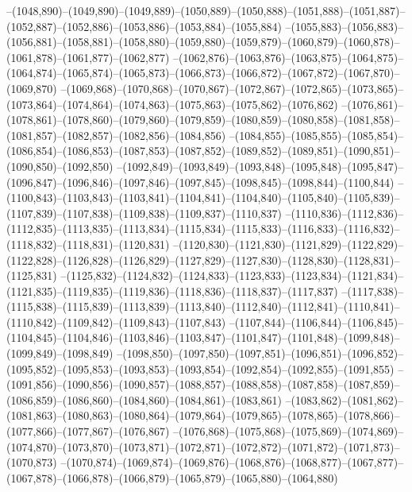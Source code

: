 --(1048,890)--(1049,890)--(1049,889)--(1050,889)--(1050,888)--(1051,888)--(1051,887)--(1052,887)--(1052,886)--(1053,886)--(1053,884)--(1055,884)
--(1055,883)--(1056,883)--(1056,881)--(1058,881)--(1058,880)--(1059,880)--(1059,879)--(1060,879)--(1060,878)--(1061,878)--(1061,877)--(1062,877)
--(1062,876)--(1063,876)--(1063,875)--(1064,875)--(1064,874)--(1065,874)--(1065,873)--(1066,873)--(1066,872)--(1067,872)--(1067,870)--(1069,870)
--(1069,868)--(1070,868)--(1070,867)--(1072,867)--(1072,865)--(1073,865)--(1073,864)--(1074,864)--(1074,863)--(1075,863)--(1075,862)--(1076,862)
--(1076,861)--(1078,861)--(1078,860)--(1079,860)--(1079,859)--(1080,859)--(1080,858)--(1081,858)--(1081,857)--(1082,857)--(1082,856)--(1084,856)
--(1084,855)--(1085,855)--(1085,854)--(1086,854)--(1086,853)--(1087,853)--(1087,852)--(1089,852)--(1089,851)--(1090,851)--(1090,850)--(1092,850)
--(1092,849)--(1093,849)--(1093,848)--(1095,848)--(1095,847)--(1096,847)--(1096,846)--(1097,846)--(1097,845)--(1098,845)--(1098,844)--(1100,844)
--(1100,843)--(1103,843)--(1103,841)--(1104,841)--(1104,840)--(1105,840)--(1105,839)--(1107,839)--(1107,838)--(1109,838)--(1109,837)--(1110,837)
--(1110,836)--(1112,836)--(1112,835)--(1113,835)--(1113,834)--(1115,834)--(1115,833)--(1116,833)--(1116,832)--(1118,832)--(1118,831)--(1120,831)
--(1120,830)--(1121,830)--(1121,829)--(1122,829)--(1122,828)--(1126,828)--(1126,829)--(1127,829)--(1127,830)--(1128,830)--(1128,831)--(1125,831)
--(1125,832)--(1124,832)--(1124,833)--(1123,833)--(1123,834)--(1121,834)--(1121,835)--(1119,835)--(1119,836)--(1118,836)--(1118,837)--(1117,837)
--(1117,838)--(1115,838)--(1115,839)--(1113,839)--(1113,840)--(1112,840)--(1112,841)--(1110,841)--(1110,842)--(1109,842)--(1109,843)--(1107,843)
--(1107,844)--(1106,844)--(1106,845)--(1104,845)--(1104,846)--(1103,846)--(1103,847)--(1101,847)--(1101,848)--(1099,848)--(1099,849)--(1098,849)
--(1098,850)--(1097,850)--(1097,851)--(1096,851)--(1096,852)--(1095,852)--(1095,853)--(1093,853)--(1093,854)--(1092,854)--(1092,855)--(1091,855)
--(1091,856)--(1090,856)--(1090,857)--(1088,857)--(1088,858)--(1087,858)--(1087,859)--(1086,859)--(1086,860)--(1084,860)--(1084,861)--(1083,861)
--(1083,862)--(1081,862)--(1081,863)--(1080,863)--(1080,864)--(1079,864)--(1079,865)--(1078,865)--(1078,866)--(1077,866)--(1077,867)--(1076,867)
--(1076,868)--(1075,868)--(1075,869)--(1074,869)--(1074,870)--(1073,870)--(1073,871)--(1072,871)--(1072,872)--(1071,872)--(1071,873)--(1070,873)
--(1070,874)--(1069,874)--(1069,876)--(1068,876)--(1068,877)--(1067,877)--(1067,878)--(1066,878)--(1066,879)--(1065,879)--(1065,880)--(1064,880)
